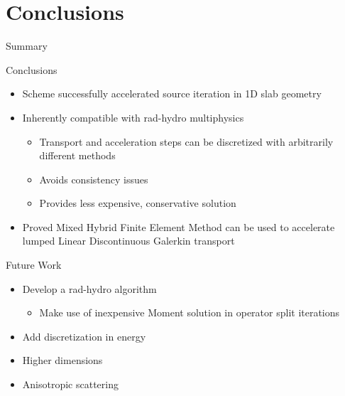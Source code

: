 \documentclass[10pt]{beamer}
\begin{document}





\section{Conclusions}

\begin{frame}{Summary}

    Conclusions
    \begin{itemize} \vspace{-.1in}
        \item Scheme successfully accelerated source iteration in 1D slab geometry 

        \item Inherently compatible with rad-hydro multiphysics 

        \begin{itemize}
            \item Transport and acceleration steps can be discretized with arbitrarily different methods 
            \item Avoids consistency issues 
            \item Provides less expensive, conservative solution 
        \end{itemize}

        \item Proved Mixed Hybrid Finite Element Method can be used to accelerate lumped Linear Discontinuous Galerkin transport 

    \end{itemize}

    Future Work 
    \begin{itemize} \vspace{-.1in}
        \item Develop a rad-hydro algorithm 

        \begin{itemize}
            \item Make use of inexpensive Moment solution in operator split iterations 
        \end{itemize}

        \item Add discretization in energy 

        \item Higher dimensions 

        \item Anisotropic scattering 

    \end{itemize}

\end{frame}
\end{document}
